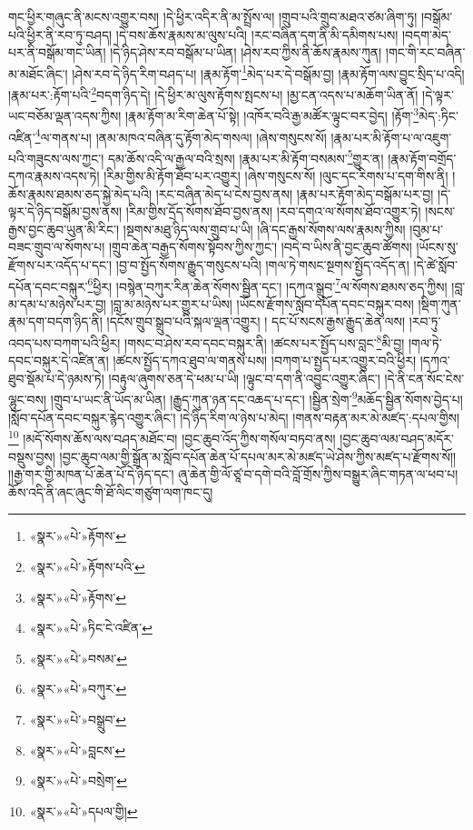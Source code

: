 གང་ཕྱིར་གཞུང་ནི་མངས་འགྱུར་བས། །དེ་ཕྱིར་འདིར་ནི་མ་སྤྲོས་ལ། །གྲུབ་པའི་གྲུབ་མཐའ་ཙམ་ཞིག་ཏུ། །བསྒོམ་པའི་ཕྱིར་ནི་རབ་ཏུ་བཤད། །དེ་བས་ཆོས་རྣམས་མ་ལུས་པའི། །རང་བཞིན་དག་ནི་མི་དམིགས་པས། །བདག་མེད་པར་ནི་བསྒོམ་གང་ཡིན། །དེ་ཉིད་ཤེས་རབ་བསྒོམ་པ་ཡིན། །ཤེས་རབ་ཀྱིས་ནི་ཆོས་རྣམས་ཀུན། །གང་གི་རང་བཞིན་མ་མཐོང་ཞིང་། །ཤེས་རབ་དེ་ཉིད་རིག་བཤད་པ། །རྣམ་རྟོག་\footnote{«སྣར་»«པེ་»རྟོགས་}མེད་པར་དེ་བསྒོམ་བྱ། །རྣམ་རྟོག་ལས་བྱུང་སྲིད་པ་འདི། །རྣམ་པར་:རྟོག་པའི་\footnote{«སྣར་»«པེ་»རྟོགས་པའི་}བདག་ཉིད་དེ། །དེ་ཕྱིར་མ་ལུས་རྟོགས་སྤངས་པ། །མྱ་ངན་འདས་པ་མཆོག་ཡིན་ནོ། །དེ་ལྟར་ཡང་བཅོམ་ལྡན་འདས་ཀྱིས། །རྣམ་རྟོག་མ་རིག་ཆེན་པོ་སྟེ། །འཁོར་བའི་རྒྱ་མཚོར་ལྟུང་བར་བྱེད། །རྟོག་\footnote{«སྣར་»«པེ་»རྟོགས་}མེད་:ཏིང་འཛིན་\footnote{«སྣར་»«པེ་»ཏིང་ངེ་འཛིན་}ལ་གནས་པ། །ནམ་མཁའ་བཞིན་དུ་རྟོག་མེད་གསལ། །ཞེས་གསུངས་སོ། །རྣམ་པར་མི་རྟོག་པ་ལ་འཇུག་པའི་གཟུངས་ལས་ཀྱང་། དམ་ཆོས་འདི་ལ་རྒྱལ་བའི་སྲས། །རྣམ་པར་མི་རྟོག་བསམས་\footnote{«སྣར་»«པེ་»བསམ་}གྱུར་ན། །རྣམ་རྟོག་བགྲོད་དཀའ་རྣམས་འདས་ཏེ། །རིམ་གྱིས་མི་རྟོག་ཐོབ་པར་འགྱུར། །ཞེས་གསུངས་སོ། །ལུང་དང་རིགས་པ་དག་གིས་ནི། །ཆོས་རྣམས་ཐམས་ཅད་སྐྱེ་མེད་པའི། །རང་བཞིན་མེད་པ་ངེས་བྱས་ནས། །རྣམ་པར་རྟོག་མེད་བསྒོམ་པར་བྱ། །དེ་ལྟར་དེ་ཉིད་བསྒོམ་བྱས་ནས། །རིམ་གྱིས་དྲོད་སོགས་ཐོབ་བྱས་ནས། །རབ་དགའ་ལ་སོགས་ཐོབ་འགྱུར་ཏེ། །སངས་རྒྱས་བྱང་ཆུབ་ཡུན་མི་རིང་། །སྔགས་མཐུ་ཉིད་ལས་གྲུབ་པ་ཡི། །ཞི་དང་རྒྱས་སོགས་ལས་རྣམས་ཀྱིས། །བུམ་པ་བཟང་གྲུབ་ལ་སོགས་པ། །གྲུབ་ཆེན་བརྒྱད་སོགས་སྟོབས་ཀྱིས་ཀྱང་། །བདེ་བ་ཡིས་ནི་བྱང་ཆུབ་ཚོགས། །ཡོངས་སུ་རྫོགས་པར་འདོད་པ་དང་། །བྱ་བ་སྤྱོད་སོགས་རྒྱུད་གསུངས་པའི། །གལ་ཏེ་གསང་སྔགས་སྤྱོད་འདོད་ན། །དེ་ཚེ་སློབ་དཔོན་དབང་བསྐུར་\footnote{«སྣར་»«པེ་»བཀུར་}ཕྱིར། །བསྙེན་བཀུར་རིན་ཆེན་སོགས་སྦྱིན་དང་། །དཀའ་སྒྲུབ་\footnote{«སྣར་»«པེ་»བསྒྲུབ་}ལ་སོགས་ཐམས་ཅད་ཀྱིས། །བླ་མ་དམ་པ་མཉེས་པར་བྱ། །བླ་མ་མཉེས་པར་གྱུར་པ་ཡིས། །ཡོངས་རྫོགས་སློབ་དཔོན་དབང་བསྐུར་བས། །སྡིག་ཀུན་རྣམ་དག་བདག་ཉིད་ནི། །དངོས་གྲུབ་སྒྲུབ་པའི་སྐལ་ལྡན་འགྱུར། །
དང་པོ་སངས་རྒྱས་རྒྱུད་ཆེན་ལས། །རབ་ཏུ་འབད་པས་བཀག་པའི་ཕྱིར། །གསང་བ་ཤེས་རབ་དབང་བསྐུར་ནི། །ཚངས་པར་སྤྱོད་པས་བླང་\footnote{«སྣར་»«པེ་»བླངས་}མི་བྱ། །གལ་ཏེ་དབང་བསྐུར་དེ་འཛིན་ན། །ཚངས་སྤྱོད་དཀའ་ཐུབ་ལ་གནས་པས། །བཀག་པ་སྤྱད་པར་འགྱུར་བའི་ཕྱིར། །དཀའ་ཐུབ་སྡོམ་པ་དེ་ཉམས་ཏེ། །བརྟུལ་ཞུགས་ཅན་དེ་ཕམ་པ་ཡི། །ལྟུང་བ་དག་ནི་འབྱུང་འགྱུར་ཞིང་། །དེ་ནི་ངན་སོང་ངེས་ལྷུང་བས། །གྲུབ་པ་ཡང་ནི་ཡོད་མ་ཡིན། །རྒྱུད་ཀུན་ཉན་དང་འཆད་པ་དང་། །སྦྱིན་སྲེག་\footnote{«སྣར་»«པེ་»བསྲེག་}མཆོད་སྦྱིན་སོགས་བྱེད་པ། །སློབ་དཔོན་དབང་བསྐུར་རྙེད་འགྱུར་ཞིང་། །དེ་ཉིད་རིག་ལ་ཉེས་པ་མེད། །གནས་བརྟན་མར་མེ་མཛད་:དཔལ་གྱིས།\footnote{«སྣར་»«པེ་»དཔལ་གྱི།} །མདོ་སོགས་ཆོས་ལས་བཤད་མཐོང་བ། །བྱང་ཆུབ་འོད་ཀྱིས་གསོལ་བཏབ་ནས། །བྱང་ཆུབ་ལམ་བཤད་མདོར་བསྡུས་བྱས། །བྱང་ཆུབ་ལམ་གྱི་སྒྲོན་མ་སློབ་དཔོན་ཆེན་པོ་དཔལ་མར་མེ་མཛད་ཡེ་ཤེས་ཀྱིས་མཛད་པ་རྫོགས་སོ།། །།རྒྱ་གར་གྱི་མཁན་པོ་ཆེན་པོ་དེ་ཉིད་དང་། ཞུ་ཆེན་གྱི་ལོ་ཙཱ་བ་དགེ་བའི་བློ་གྲོས་ཀྱིས་བསྒྱུར་ཞིང་གཏན་ལ་ཕབ་པ། ཆོས་འདི་ནི་ཞང་ཞུང་གི་ཐོ་ལིང་གཙུག་ལག་ཁང་དུ། 